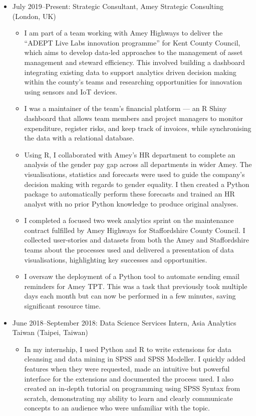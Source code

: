 \documentclass[11pt, a4paper]{article}
\begin{document}
\begin{itemize}
	\item July 2019--Present: Strategic Consultant, Amey Strategic Consulting (London, UK)
	\begin{itemize}
		\item I am part of a team working with Amey Highways to deliver the \enquote{ADEPT Live Labs innovation programme} for Kent County Council, which aims to develop data-led approaches to the management of asset management and steward efficiency.
		This involved building a dashboard integrating existing data to support analytics driven decision making within the county's teams and researching opportunities for innovation using sensors and IoT devices.
		\item I was a maintainer of the team's financial platform --- an R Shiny dashboard that allows team members and project managers to monitor expenditure, register risks, and keep track of invoices, while synchronising the data with a relational database.
		\item Using R, I collaborated with Amey's HR department to complete an analysis of the gender pay gap across all departments in wider Amey.
		The visualisations, statistics and forecasts were used to guide the company's decision making with regards to gender equality.
		I then created a Python package to automatically perform these forecasts and trained an HR analyst with no prior Python knowledge to produce original analyses.
		\item I completed a focused two week analytics sprint on the maintenance contract fulfilled by Amey Highways for Staffordshire County Council.
		I collected user-stories and datasets from both the Amey and Staffordshire teams about the processes used and delivered a presentation of data visualisations, highlighting key successes and opportunities.
		\item I oversaw the deployment of a Python tool to automate sending email reminders for Amey TPT.
		This was a task that previously took multiple days each month but can now be performed in a few minutes, saving significant resource time.
	\end{itemize}

	\item June 2018--September 2018: Data Science Services Intern, Asia Analytics Taiwan (Taipei, Taiwan)
	\begin{itemize}
		\item In my internship, I used Python and R to write extensions for data cleansing and data mining in SPSS and SPSS Modeller.
		I quickly added features when they were requested, made an intuitive but powerful interface for the extensions and documented the process used.
		I also created an in-depth tutorial on programming using SPSS Syntax from scratch, demonstrating my ability to learn and clearly communicate concepts to an audience who were unfamiliar with the topic.
	\end{itemize}
\end{itemize}
\end{document}
